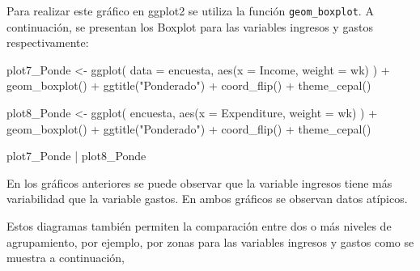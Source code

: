 \documentclass[
  12pt,
]{book}
\newenvironment{Shaded}{\begin{snugshade}}{\end{snugshade}}
\newcommand{\AttributeTok}[1]{\textcolor[rgb]{0.77,0.63,0.00}{#1}}
\newcommand{\FunctionTok}[1]{\textcolor[rgb]{0.00,0.00,0.00}{#1}}
\newcommand{\NormalTok}[1]{#1}
\newcommand{\OtherTok}[1]{\textcolor[rgb]{0.56,0.35,0.01}{#1}}
\newcommand{\SpecialCharTok}[1]{\textcolor[rgb]{0.00,0.00,0.00}{#1}}
\newcommand{\StringTok}[1]{\textcolor[rgb]{0.31,0.60,0.02}{#1}}
\begin{document}
Para realizar este gráfico en ggplot2 se utiliza la función \texttt{geom\_boxplot}. A continuación, se presentan los Boxplot para las variables ingresos y gastos respectivamente:

\begin{Shaded}
\begin{Highlighting}[]
\NormalTok{plot7\_Ponde }\OtherTok{\textless{}{-}} \FunctionTok{ggplot}\NormalTok{(}
  \AttributeTok{data =}\NormalTok{ encuesta, }\FunctionTok{aes}\NormalTok{(}\AttributeTok{x =}\NormalTok{ Income, }\AttributeTok{weight =}\NormalTok{ wk)}
\NormalTok{) }\SpecialCharTok{+}
  \FunctionTok{geom\_boxplot}\NormalTok{() }\SpecialCharTok{+}
  \FunctionTok{ggtitle}\NormalTok{(}\StringTok{"Ponderado"}\NormalTok{) }\SpecialCharTok{+}
  \FunctionTok{coord\_flip}\NormalTok{() }\SpecialCharTok{+}
  \FunctionTok{theme\_cepal}\NormalTok{()}


\NormalTok{plot8\_Ponde }\OtherTok{\textless{}{-}} \FunctionTok{ggplot}\NormalTok{(}
\NormalTok{  encuesta,}
  \FunctionTok{aes}\NormalTok{(}\AttributeTok{x =}\NormalTok{ Expenditure, }\AttributeTok{weight =}\NormalTok{ wk)}
\NormalTok{) }\SpecialCharTok{+}
  \FunctionTok{geom\_boxplot}\NormalTok{() }\SpecialCharTok{+}
  \FunctionTok{ggtitle}\NormalTok{(}\StringTok{"Ponderado"}\NormalTok{) }\SpecialCharTok{+}
  \FunctionTok{coord\_flip}\NormalTok{() }\SpecialCharTok{+}
  \FunctionTok{theme\_cepal}\NormalTok{()}

\NormalTok{plot7\_Ponde }\SpecialCharTok{|}\NormalTok{ plot8\_Ponde}
\end{Highlighting}
\end{Shaded}

En los gráficos anteriores se puede observar que la variable ingresos tiene más variabilidad que la variable gastos. En ambos gráficos se observan datos atípicos.

Estos diagramas también permiten la comparación entre dos o más niveles de agrupamiento, por ejemplo, por zonas para las variables ingresos y gastos como se muestra a continuación,
\end{document}
